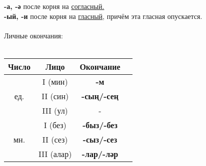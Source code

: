 \textbf{-а, -ә} после корня на \underline{согласный.}\\
\textbf{-ый, -и} после корня на \underline{гласный}, причём эта гласная опускается.\\\\
Личные окончания:\\\\
\begin{tabular}{ |c|c|c|c| } 
\hline
Число & Лицо & Окончание \\
\hline
\multirow{3}{4em}{ед.}
& I (мин) & \textbf{-м} \\  
& II (син) & \textbf{-сың/-сең} \\ 
& III (ул) & - \\ 
\hline
\multirow{3}{4em}{мн.}
& I (без) & \textbf{-быз/-без} \\  
& II (сез) & \textbf{-сыз/-сез} \\ 
& III (алар) & \textbf{-лар/-ләр} \\ 
\hline
\end{tabular} \\\\